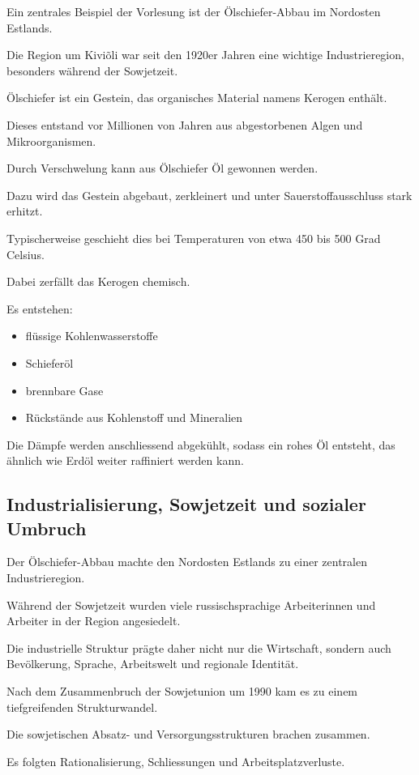 Ein zentrales Beispiel der Vorlesung
ist der Ölschiefer-Abbau im Nordosten Estlands.

Die Region um Kiviõli
war seit den 1920er Jahren
eine wichtige Industrieregion,
besonders während der Sowjetzeit.

Ölschiefer ist ein Gestein,
das organisches Material namens Kerogen enthält.

Dieses entstand vor Millionen von Jahren
aus abgestorbenen Algen und Mikroorganismen.

Durch Verschwelung kann aus Ölschiefer
Öl gewonnen werden.

Dazu wird das Gestein abgebaut,
zerkleinert
und unter Sauerstoffausschluss stark erhitzt.

Typischerweise geschieht dies bei Temperaturen
von etwa 450 bis 500 Grad Celsius.

Dabei zerfällt das Kerogen chemisch.

Es entstehen:

\begin{itemize}
\item flüssige Kohlenwasserstoffe
\item Schieferöl
\item brennbare Gase
\item Rückstände aus Kohlenstoff und Mineralien
\end{itemize}

Die Dämpfe werden anschliessend abgekühlt,
sodass ein rohes Öl entsteht,
das ähnlich wie Erdöl weiter raffiniert werden kann.

\subsection{Industrialisierung, Sowjetzeit und sozialer Umbruch}

Der Ölschiefer-Abbau machte den Nordosten Estlands
zu einer zentralen Industrieregion.

Während der Sowjetzeit
wurden viele russischsprachige Arbeiterinnen und Arbeiter
in der Region angesiedelt.

Die industrielle Struktur
prägte daher nicht nur die Wirtschaft,
sondern auch Bevölkerung,
Sprache,
Arbeitswelt
und regionale Identität.

Nach dem Zusammenbruch der Sowjetunion um 1990
kam es zu einem tiefgreifenden Strukturwandel.

Die sowjetischen Absatz-
und Versorgungsstrukturen brachen zusammen.

Es folgten Rationalisierung,
Schliessungen
und Arbeitsplatzverluste.

